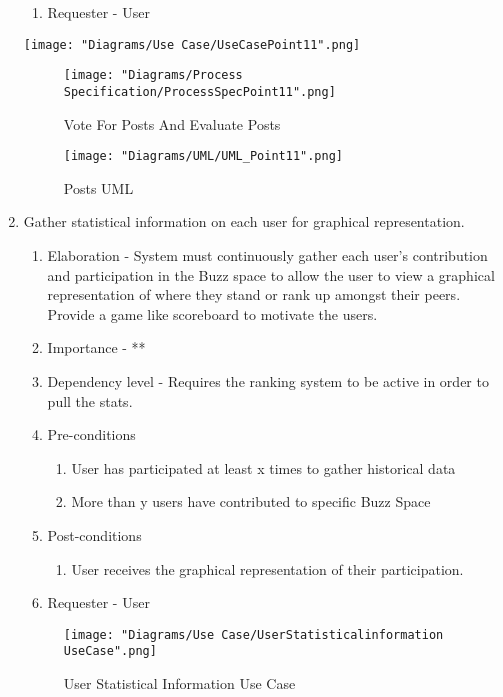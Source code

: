 \documentclass[12pt]{article}
\begin{document}
\begin{enumerate}
\begin{enumerate}
    \item Requester - User
  \end{enumerate}
  	\texttt{[image: "Diagrams/Use Case/UseCasePoint11".png]}
	  \begin{figure}[h]
  		\centering
  		\texttt{[image: "Diagrams/Process Specification/ProcessSpecPoint11".png]}
  		\caption{Vote For Posts And Evaluate Posts}
  	\end{figure}
		\begin{figure}[h]
  		\centering
  		\texttt{[image: "Diagrams/UML/UML\_Point11".png]}
  		\caption{Posts UML}
  	\end{figure}
\clearpage %
   \item Gather statistical information on each user for graphical representation. %
  \begin{enumerate}
    \item Elaboration - System must continuously gather each user’s contribution and participation in the Buzz space to allow the user to view a graphical representation of where they stand or rank up amongst their peers. Provide a game like scoreboard to motivate the users.
    \item Importance - **
    \item Dependency level - Requires the ranking system to be active in order to pull the stats. 
    \item Pre-conditions
    \begin{enumerate}
    	\item User has participated at least x times to gather historical data
    	\item More than y users have contributed to specific Buzz Space
    \end{enumerate}
        \item Post-conditions
    \begin{enumerate}
    	\item User receives the graphical representation of their participation.
    \end{enumerate}
    \item Requester - User
  \end{enumerate}
  \begin{figure}[h]
  	\centering
  	\texttt{[image: "Diagrams/Use Case/UserStatisticalinformation UseCase".png]}
  	\caption{User Statistical Information Use Case}
  \end{figure}
  \begin{figure}[h]

\end{figure}
\end{enumerate}
\end{document}
